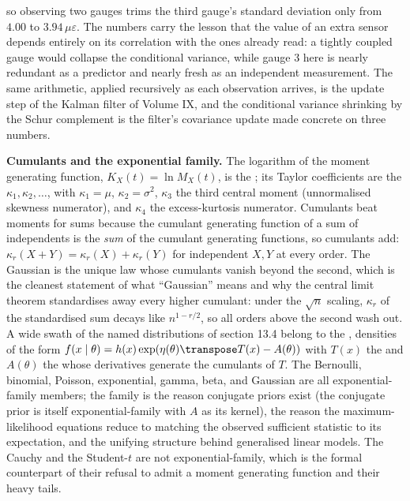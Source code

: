 so observing two gauges trims the third gauge's standard deviation only
from $4.00$ to $3.94\,\mu\varepsilon$. The numbers carry the lesson that
the value of an extra sensor depends entirely on its correlation with
the ones already read: a tightly coupled gauge would collapse the
conditional variance, while gauge $3$ here is nearly redundant as a
predictor and nearly fresh as an independent measurement. The same
arithmetic, applied recursively as each observation arrives, is the
update step of the Kalman filter of Volume IX, and the conditional
variance shrinking by the Schur complement is the filter's covariance
update made concrete on three numbers.

\begin{mastery}
\textbf{Cumulants and the exponential family.} The logarithm of the
moment generating function, $K_{X}(t) = \ln M_{X}(t)$, is the
; its Taylor coefficients are the
 $\kappa_{1}, \kappa_{2}, \ldots$, with $\kappa_{1} =
\mu$, $\kappa_{2} = \sigma^{2}$, $\kappa_{3}$ the third central moment
(unnormalised skewness numerator), and $\kappa_{4}$ the excess-kurtosis
numerator. Cumulants beat moments for sums because the cumulant
generating function of a sum of independents is the \emph{sum} of the
cumulant generating functions, so cumulants add: $\kappa_{r}(X + Y) =
\kappa_{r}(X) + \kappa_{r}(Y)$ for independent $X, Y$ at every order.
The Gaussian is the unique law whose cumulants vanish beyond the second,
which is the cleanest statement of what ``Gaussian'' means and why the
central limit theorem standardises away every higher cumulant: under the
$\sqrt{n}$ scaling, $\kappa_{r}$ of the standardised sum decays like
$n^{1 - r/2}$, so all orders above the second wash out. A wide swath of
the named distributions of section 13.4 belong to the
, densities of the form $f(x \mid \theta) =
h(x)\exp(\eta(\theta)\transpose T(x) - A(\theta))$ with $T(x)$ the
 and $A(\theta)$ the
 whose derivatives generate the cumulants
of $T$. The Bernoulli, binomial, Poisson, exponential, gamma, beta, and
Gaussian are all exponential-family members; the family is the reason
conjugate priors exist (the conjugate prior is itself exponential-family
with $A$ as its kernel), the reason the maximum-likelihood equations
reduce to matching the observed sufficient statistic to its expectation,
and the unifying structure behind generalised linear models. The Cauchy
and the Student-$t$ are not exponential-family, which is the formal
counterpart of their refusal to admit a moment generating function and
their heavy tails.
\end{mastery}

